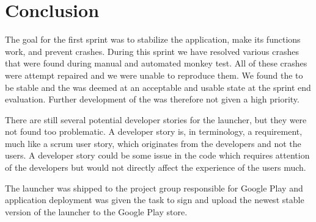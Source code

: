 
\chapter{Conclusion}
\label{cha:conclusion}

The goal for the first sprint was to stabilize the \launcher application, make its functions work, and prevent crashes. During this sprint we have resolved various crashes that were found during manual and automated monkey test. All of these crashes were attempt repaired and we were unable to reproduce them. We found the \launcher to be stable and the \launcher was deemed at an acceptable and usable state at the sprint end evaluation. Further development of the \launcher was therefore not given a high priority. 

There are still several potential developer stories for the launcher, but they were not found too problematic. A developer story is, in \giraf terminology, a requirement, much like a scrum user story, which originates from the developers and not the users. A developer story could be some issue in the code which requires attention of the developers but would not directly affect the experience of the users much.    


The launcher was shipped to the project group responsible for Google Play and application deployment was given the task to sign and upload the newest stable version of the launcher to the Google Play store. 






